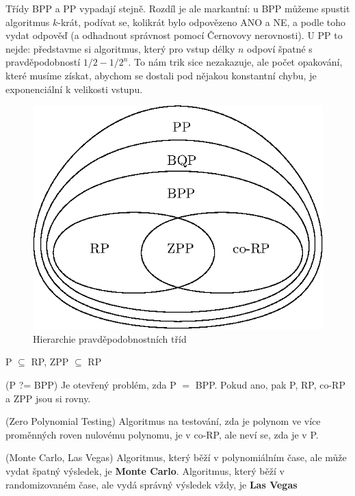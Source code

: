 \poz Třídy BPP a PP vypadají stejně. Rozdíl je ale markantní: u BPP můžeme
spustit algoritmus $k$-krát, podívat se, kolikrát bylo odpovězeno ANO a NE, a
podle toho vydat odpověď (a odhadnout správnost pomocí Černovovy nerovnosti). U
PP to nejde: představme si algoritmus, který pro vstup délky $n$ odpoví špatné s
pravděpodobností $1/2-1/2^n$. To nám trik sice nezakazuje, ale počet opakování,
které musíme získat, abychom se dostali pod nějakou konstantní chybu, je
exponenciální k velikosti vstupu.

\begin{figure}
	\centering
	\includegraphics{img/rp-hierarchy.eps}
	\caption{Hierarchie pravděpodobnostních tříd}
\end{figure}

\vt P $\subseteq$ RP, ZPP $\subseteq$ RP

\tv (P ?= BPP) Je otevřený problém, zda P $=$ BPP. Pokud ano, pak P, RP, co-RP a
ZPP jsou si rovny.

\tv (Zero Polynomial Testing) Algoritmus na testování, zda je polynom ve více
proměnných roven nulovému polynomu, je v co-RP, ale  neví se, zda je v P.

\df (Monte Carlo, Las Vegas) Algoritmus, který běží v polynomiálním čase, ale
může vydat špatný výsledek, je {\bf Monte Carlo}. Algoritmus, který běží v
randomizovaném čase, ale vydá správný výsledek vždy, je {\bf Las Vegas}
